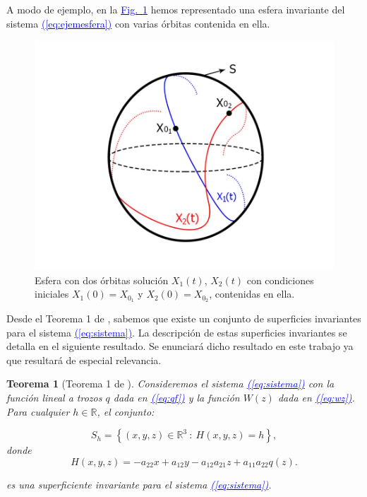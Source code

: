 \documentclass[12pt,a4paper]{report} %
\newtheorem{theorem}{Teorema}[chapter]
\newcommand{\fref}[1]{\hyperref[#1]{\textcolor{blue}{Fig.~\ref*{#1}}}}
\newcommand{\eref}[1]{\hyperref[#1]{\textcolor{blue}{(\ref*{#1})}}}
\begin{document}
	\vspace{0.5cm}A modo de ejemplo, en la \fref{fig:esfera} hemos representado una esfera invariante del sistema \eref{eq:ejemesfera} con varias órbitas contenida en ella.
	
	\begin{figure}[h]
		\centering
		\includegraphics[width=1\textwidth]{esfera.jpg}
		\caption{Esfera con dos órbitas solución $X_1(t)$, $X_2(t)$ con condiciones iniciales $X_1(0)=X_{0_1}$ y $X_2(0)=X_{0_2}$, contenidas en ella.}
		\label{fig:esfera}
	\end{figure}\smallskip
	\newpage
	
	\vspace{0.5cm}Desde el Teorema 1 de \cite{ponce}, sabemos que existe un conjunto de superficies invariantes para el sistema \eref{eq:sistema}. La descripción de estas superficies invariantes se detalla en el siguiente resultado. Se enunciará dicho resultado en este trabajo ya que resultará de especial relevancia.

	\begin{theorem}[Teorema 1 de \cite{ponce}]
		\label{teorema1}
		Consideremos el sistema \eref{eq:sistema} con la función lineal a trozos $q$ dada en \eref{eq:qf} y la función $W(z)$ dada en \eref{eq:wz}. Para cualquier $h \in \mathbb{R}$, el conjunto:
		
		\begin{equation}
			\label{eq:sh}
			S_h=\left\{(x,y,z)\in \mathbb{R}^3\: : \: H(x,y,z)=h \right\},
		\end{equation}
		donde
		\begin{equation}
			\label{eq:hecuation}
			H(x,y,z)=-a_{22}x+a_{12}y-a_{12}a_{21}z+a_{11}a_{22}q(z).
		\end{equation}\smallskip
		
		\noindent es una superficiente invariante para el sistema \eref{eq:sistema}.
		
		\end{theorem}
		
\end{document}
